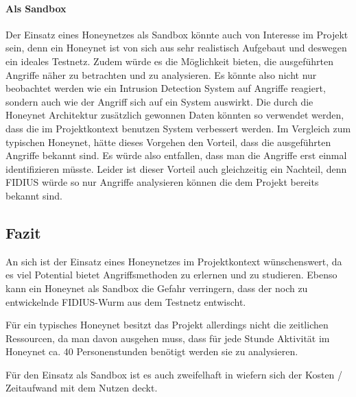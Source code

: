 \paragraph*{Als Sandbox} Der Einsatz eines Honeynetzes als Sandbox
könnte auch von Interesse im Projekt sein, denn ein Honeynet ist von
sich aus sehr realistisch Aufgebaut und deswegen ein ideales
Testnetz. Zudem würde es die Möglichkeit bieten, die ausgeführten
Angriffe näher zu betrachten und zu analysieren. Es könnte also nicht
nur beobachtet werden wie ein Intrusion Detection System auf Angriffe
reagiert, sondern auch wie der Angriff sich auf ein System
auswirkt. Die durch die Honeynet Architektur zusätzlich gewonnen Daten
könnten so verwendet werden, dass die im Projektkontext benutzen
System verbessert werden.  Im Vergleich zum typischen Honeynet, hätte
dieses Vorgehen den Vorteil, dass die ausgeführten Angriffe bekannt
sind. Es würde also entfallen, dass man die Angriffe erst einmal
identifizieren müsste. Leider ist dieser Vorteil auch gleichzeitig ein
Nachteil, denn FIDIUS würde so nur Angriffe analysieren können die dem
Projekt bereits bekannt sind.

\subsection{Fazit} An sich ist der Einsatz eines Honeynetzes im
Projektkontext wünschenswert, da es viel Potential bietet
Angriffsmethoden zu erlernen und zu studieren. Ebenso kann ein
Honeynet als Sandbox die Gefahr verringern, dass der noch zu
entwickelnde FIDIUS-Wurm aus dem Testnetz entwischt.

Für ein typisches Honeynet besitzt das Projekt allerdings nicht die
zeitlichen Ressourcen, da man davon ausgehen muss, dass für jede
Stunde Aktivität im Honeynet ca. 40 Personenstunden benötigt werden
sie zu analysieren.

Für den Einsatz als Sandbox ist es auch zweifelhaft in wiefern sich
der Kosten / Zeitaufwand mit dem Nutzen deckt.
